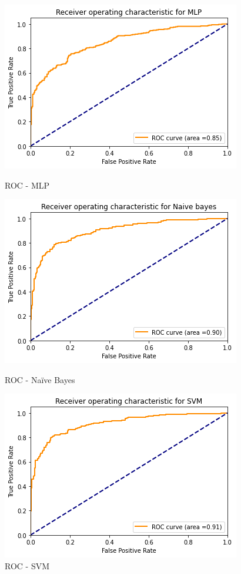 \begin{figure}[H]
\centering
{}
  \includegraphics[width=\linewidth]{Images/mlp_roc.png}
  \caption{ROC - MLP}\label{fig:awesome_image1}
\endminipage\hfill
{}
  \includegraphics[width=\linewidth]{Images/nb_roc.png}
  \caption{ROC - Naïve Bayes}\label{fig:awesome_image2}
\endminipage\hfill
{}%
  \includegraphics[width=\linewidth]{Images/svm_roc.png}
  \caption{ROC - SVM}\label{fig:awesome_image3}
\endminipage
\end{figure}

